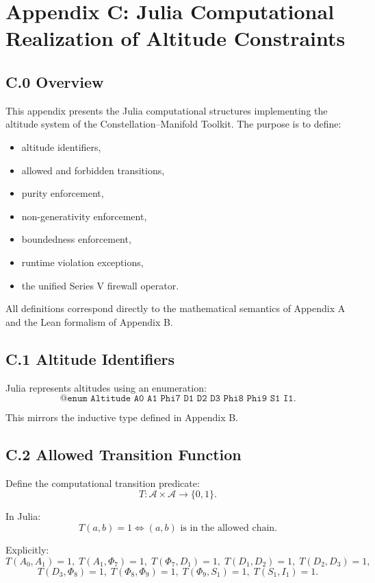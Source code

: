 \appendix
\section*{Appendix C: Julia Computational Realization of Altitude Constraints}

\subsection*{C.0 Overview}

This appendix presents the Julia computational structures implementing
the altitude system of the Constellation–Manifold Toolkit.  
The purpose is to define:
\begin{itemize}
    \item altitude identifiers,
    \item allowed and forbidden transitions,
    \item purity enforcement,
    \item non-generativity enforcement,
    \item boundedness enforcement,
    \item runtime violation exceptions,
    \item the unified Series V firewall operator.
\end{itemize}

All definitions correspond directly to the mathematical semantics of
Appendix A and the Lean formalism of Appendix B.

\subsection*{C.1 Altitude Identifiers}

Julia represents altitudes using an enumeration:
\[
\texttt{@enum Altitude A0 A1 Phi7 D1 D2 D3 Phi8 Phi9 S1 I1}.
\]

This mirrors the inductive type defined in Appendix B.

\subsection*{C.2 Allowed Transition Function}

Define the computational transition predicate:
\[
T : \mathcal{A} \times \mathcal{A} \to \{0,1\}.
\]

In Julia:
\[
T(a,b) = 1 \iff (a,b) \text{ is in the allowed chain}.
\]

Explicitly:
\[
T(A_0,A_1)=1,\;
T(A_1,\Phi_7)=1,\;
T(\Phi_7,D_1)=1,\;
T(D_1,D_2)=1,\;
T(D_2,D_3)=1,
\]
\[
T(D_3,\Phi_8)=1,\;
T(\Phi_8,\Phi_9)=1,\;
T(\Phi_9,S_1)=1,\;
T(S_1,I_1)=1.
\]

